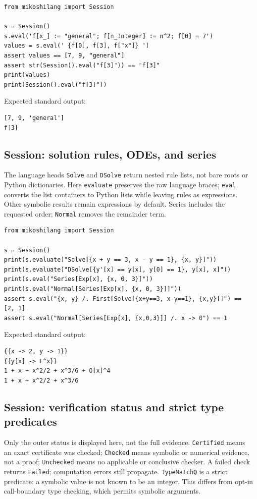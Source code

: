 \begin{lstlisting}[style=mikoshi]
from mikoshilang import Session

s = Session()
s.eval('f[x_] := "general"; f[n_Integer] := n^2; f[0] = 7')
values = s.eval(' {f[0], f[3], f["x"]} ')
assert values == [7, 9, "general"]
assert str(Session().eval("f[3]")) == "f[3]"
print(values)
print(Session().eval("f[3]"))
\end{lstlisting}
\noindent Expected standard output:
\begin{lstlisting}[style=mikoshi]
[7, 9, 'general']
f[3]
\end{lstlisting}

\subsection{Session: solution rules, ODEs, and series}
The language heads \texttt{Solve} and \texttt{DSolve} return nested rule lists, not bare roots or Python dictionaries. Here \texttt{evaluate} preserves the raw language braces; \texttt{eval} converts the list containers to Python lists while leaving rules as expressions. Other symbolic results remain expressions by default. Series includes the requested order; \texttt{Normal} removes the remainder term.

\begin{lstlisting}[style=mikoshi]
from mikoshilang import Session

s = Session()
print(s.evaluate("Solve[{x + y == 3, x - y == 1}, {x, y}]"))
print(s.evaluate("DSolve[{y'[x] == y[x], y[0] == 1}, y[x], x]"))
print(s.eval("Series[Exp[x], {x, 0, 3}]"))
print(s.eval("Normal[Series[Exp[x], {x, 0, 3}]]"))
assert s.eval("{x, y} /. First[Solve[{x+y==3, x-y==1}, {x,y}]]") == [2, 1]
assert s.eval("Normal[Series[Exp[x], {x,0,3}]] /. x -> 0") == 1
\end{lstlisting}
\noindent Expected standard output:
\begin{lstlisting}[style=mikoshi]
{{x -> 2, y -> 1}}
{{y[x] -> E^x}}
1 + x + x^2/2 + x^3/6 + O[x]^4
1 + x + x^2/2 + x^3/6
\end{lstlisting}

\subsection{Session: verification status and strict type predicates}
Only the outer status is displayed here, not the full evidence. \texttt{Certified} means an exact certificate was checked; \texttt{Checked} means symbolic or numerical evidence, not a proof; \texttt{Unchecked} means no applicable or conclusive checker. A failed check returns \texttt{Failed}; computation errors still propagate. \texttt{TypeMatchQ} is a strict predicate: a symbolic value is not known to be an integer. This differs from opt-in call-boundary type checking, which permits symbolic arguments.

